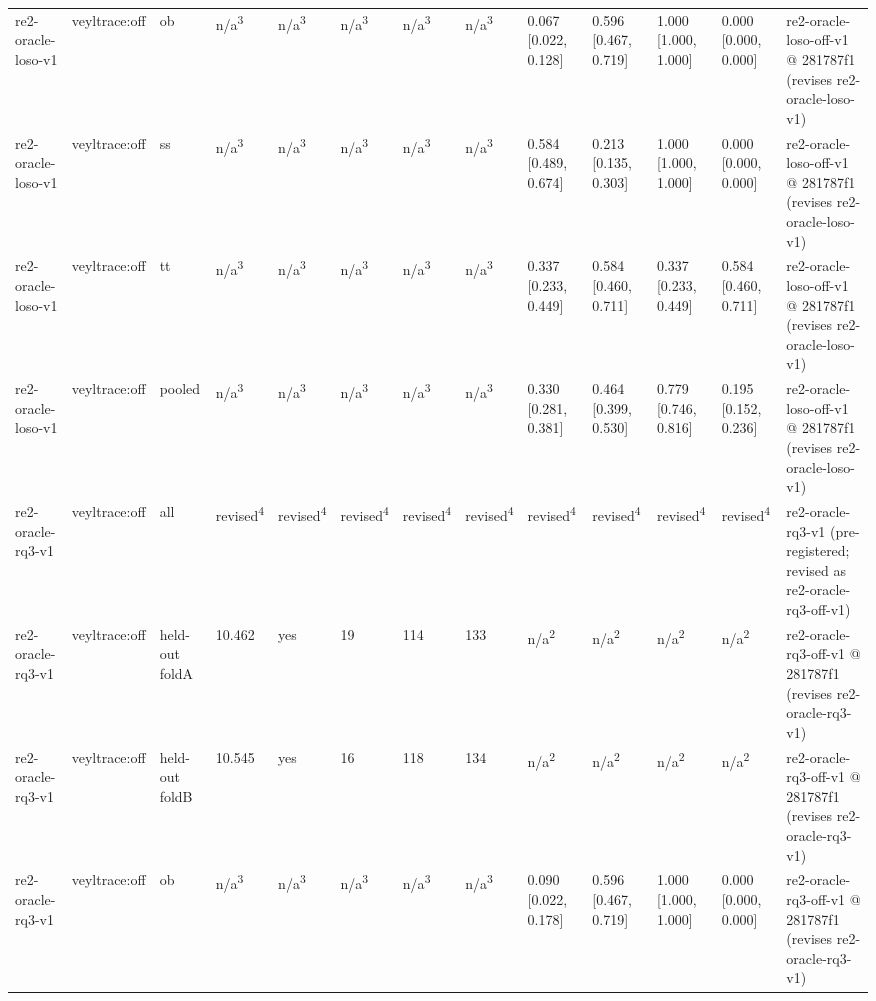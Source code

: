 \begin{table}[t]
\begin{tabular}{lllllllllllll}
re2-oracle-loso-v1 & veyltrace:off & ob & n/a\textsuperscript{3} & n/a\textsuperscript{3} & n/a\textsuperscript{3} & n/a\textsuperscript{3} & n/a\textsuperscript{3} & 0.067 [0.022, 0.128] & 0.596 [0.467, 0.719] & 1.000 [1.000, 1.000] & 0.000 [0.000, 0.000] & re2-oracle-loso-off-v1 @ 281787f1 (revises re2-oracle-loso-v1) \\
re2-oracle-loso-v1 & veyltrace:off & ss & n/a\textsuperscript{3} & n/a\textsuperscript{3} & n/a\textsuperscript{3} & n/a\textsuperscript{3} & n/a\textsuperscript{3} & 0.584 [0.489, 0.674] & 0.213 [0.135, 0.303] & 1.000 [1.000, 1.000] & 0.000 [0.000, 0.000] & re2-oracle-loso-off-v1 @ 281787f1 (revises re2-oracle-loso-v1) \\
re2-oracle-loso-v1 & veyltrace:off & tt & n/a\textsuperscript{3} & n/a\textsuperscript{3} & n/a\textsuperscript{3} & n/a\textsuperscript{3} & n/a\textsuperscript{3} & 0.337 [0.233, 0.449] & 0.584 [0.460, 0.711] & 0.337 [0.233, 0.449] & 0.584 [0.460, 0.711] & re2-oracle-loso-off-v1 @ 281787f1 (revises re2-oracle-loso-v1) \\
re2-oracle-loso-v1 & veyltrace:off & pooled & n/a\textsuperscript{3} & n/a\textsuperscript{3} & n/a\textsuperscript{3} & n/a\textsuperscript{3} & n/a\textsuperscript{3} & 0.330 [0.281, 0.381] & 0.464 [0.399, 0.530] & 0.779 [0.746, 0.816] & 0.195 [0.152, 0.236] & re2-oracle-loso-off-v1 @ 281787f1 (revises re2-oracle-loso-v1) \\
re2-oracle-rq3-v1 & veyltrace:off & all & revised\textsuperscript{4} & revised\textsuperscript{4} & revised\textsuperscript{4} & revised\textsuperscript{4} & revised\textsuperscript{4} & revised\textsuperscript{4} & revised\textsuperscript{4} & revised\textsuperscript{4} & revised\textsuperscript{4} & re2-oracle-rq3-v1 (pre-registered; revised as re2-oracle-rq3-off-v1) \\
re2-oracle-rq3-v1 & veyltrace:off & held-out foldA & 10.462 & yes & 19 & 114 & 133 & n/a\textsuperscript{2} & n/a\textsuperscript{2} & n/a\textsuperscript{2} & n/a\textsuperscript{2} & re2-oracle-rq3-off-v1 @ 281787f1 (revises re2-oracle-rq3-v1) \\
re2-oracle-rq3-v1 & veyltrace:off & held-out foldB & 10.545 & yes & 16 & 118 & 134 & n/a\textsuperscript{2} & n/a\textsuperscript{2} & n/a\textsuperscript{2} & n/a\textsuperscript{2} & re2-oracle-rq3-off-v1 @ 281787f1 (revises re2-oracle-rq3-v1) \\
re2-oracle-rq3-v1 & veyltrace:off & ob & n/a\textsuperscript{3} & n/a\textsuperscript{3} & n/a\textsuperscript{3} & n/a\textsuperscript{3} & n/a\textsuperscript{3} & 0.090 [0.022, 0.178] & 0.596 [0.467, 0.719] & 1.000 [1.000, 1.000] & 0.000 [0.000, 0.000] & re2-oracle-rq3-off-v1 @ 281787f1 (revises re2-oracle-rq3-v1) \\

\end{tabular}
\end{table}
